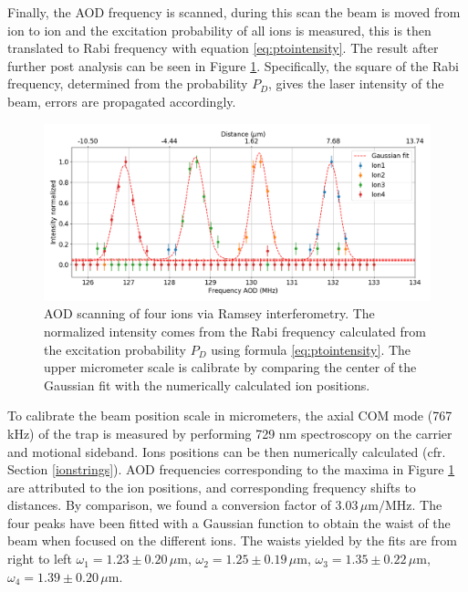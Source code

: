 Finally, the AOD frequency is scanned, during this scan the beam is moved from ion to ion and the excitation probability of all ions is measured, this is then translated to Rabi frequency with equation \eqref{eq:ptointensity}. The result after further post analysis can be seen in Figure \ref{AODscan}. Specifically, the square of the Rabi frequency, determined from the probability $P_D$, gives the laser intensity of the beam, errors are propagated accordingly.
\begin{figure}
\centering
\includegraphics[width=\textwidth]{img/AODScan}
\caption{AOD scanning of four ions via Ramsey interferometry. The normalized intensity comes from the Rabi frequency calculated from the excitation probability $P_D$ using formula \eqref{eq:ptointensity}. The upper micrometer scale is calibrate by comparing the center of the Gaussian fit with the numerically calculated ion positions.}
\label{AODscan}
\end{figure}
To calibrate the beam position scale in micrometers, the axial COM mode (767 kHz) of the trap is measured by performing 729 nm spectroscopy on the carrier and motional sideband. Ions positions can be then numerically calculated (cfr. Section \ref{ionstrings}). AOD frequencies corresponding to the maxima in Figure \ref{AODscan} are attributed to the ion positions, and corresponding frequency shifts to distances. By comparison, we found a conversion factor of $3.03\,\mu\text{m}/\text{MHz}$.
The four peaks have been fitted with a Gaussian function to obtain the waist of the beam when focused on the different ions. The waists yielded by the fits are from right to left $\omega_1 = 1.23\pm 0.20\,\mu$m, $\omega_2 = 1.25\pm 0.19\,\mu$m, $ \omega_3 = 1.35\pm 0.22\,\mu$m, $\omega_4 = 1.39\pm 0.20\,\mu$m.\\
